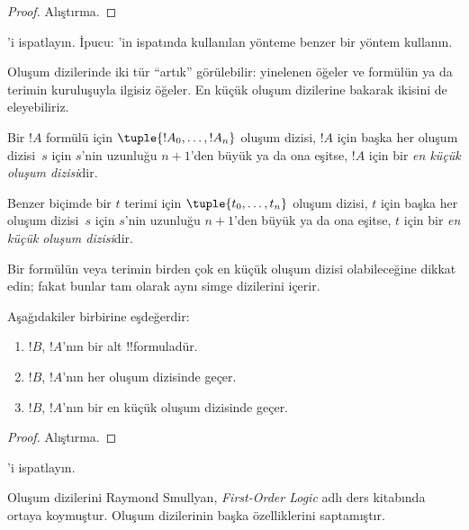\begin{proof}
Alıştırma.
\end{proof}

\begin{prob}
'i ispatlayın.
İpucu: 'in ispatında kullanılan
yönteme benzer bir yöntem kullanın.
\end{prob}

Oluşum dizilerinde iki tür ``artık'' görülebilir: yinelenen öğeler ve
formülün ya da terimin kuruluşuyla ilgisiz öğeler. En küçük oluşum
dizilerine bakarak ikisini de eleyebiliriz.

\begin{defn}
Bir $!A$ formülü için $\tuple{!A_0, \ldots, !A_n}$ oluşum dizisi,
$!A$ için başka her oluşum dizisi~$s$ için $s$'nin uzunluğu $n+1$'den büyük ya da
ona eşitse, $!A$ için bir \emph{en küçük oluşum dizisi}dir.

Benzer biçimde bir $t$ terimi için $\tuple{t_0, \ldots, t_n}$ oluşum
dizisi, $t$ için başka her oluşum dizisi~$s$ için $s$'nin uzunluğu $n+1$'den büyük
ya da ona eşitse, $t$ için bir \emph{en küçük oluşum dizisi}dir.
\end{defn}

Bir formülün veya terimin birden çok en küçük oluşum dizisi olabileceğine
dikkat edin; fakat bunlar tam olarak aynı simge dizilerini içerir.

\begin{prop}
Aşağıdakiler birbirine eşdeğerdir:
\begin{enumerate}
    \item $!B$, $!A$'nın bir alt !!{formula}{}dür.
    \item $!B$, $!A$'nın her oluşum dizisinde geçer.
    \item $!B$, $!A$'nın bir en küçük oluşum dizisinde geçer.
\end{enumerate}
\end{prop}

\begin{proof}
Alıştırma.
\end{proof}

\begin{prob}
'i ispatlayın.
\end{prob}

\begin{history}
Oluşum dizilerini Raymond Smullyan, \emph{First-Order Logic}
\citep{Smullyan1968} adlı ders kitabında ortaya koymuştur. Oluşum
dizilerinin başka özelliklerini \citet{Zuckerman1973} saptamıştır.
\end{history}

